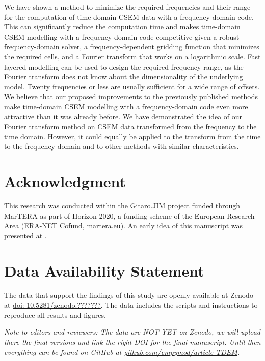 \documentclass[
    manuscript,
    revised,
  ]{geophysics}
\begin{document}
We have shown a method to minimize the required frequencies and their range for
the computation of time-domain CSEM data with a frequency-domain code. This can
significantly reduce the computation time and makes time-domain CSEM modelling
with a frequency-domain code competitive given a robust frequency-domain
solver, a frequency-dependent gridding function that minimizes the required
cells, and a Fourier transform that works on a logarithmic scale. Fast layered
modelling can be used to design the required frequency range, as the Fourier
transform does not know about the dimensionality of the underlying model.
Twenty frequencies or less are usually sufficient for a wide range of offsets.
 We believe that our proposed improvements to the previously
published methods make time-domain CSEM modelling with a frequency-domain code
even more attractive than it was already before. We have demonstrated the idea
of our Fourier transform method on CSEM data transformed from the frequency to
the time domain. However, it could equally be applied to the transform from the
time to the frequency domain and to other methods with similar
characteristics.

\section{Acknowledgment}

This research was conducted within the Gitaro.JIM project funded through
MarTERA as part of Horizon 2020, a funding scheme of the European Research Area
(ERA-NET Cofund, \href{https://www.martera.eu}{martera.eu}).
An early idea of this manuscript was presented at \cite{EAGE.20.Werthmuller}.

\section{Data Availability Statement}

The data that support the findings of this study are openly available at Zenodo
at \href{https://zenodo.org/badge/DOI/10.5281/zenodo.???????}{doi:
10.5281/zenodo.???????}. The data includes the scripts and instructions to
reproduce all results and figures.

\emph{Note to editors and reviewers: The data are NOT YET on Zenodo, we will
  upload there the final versions and link the right DOI for the final
  manuscript. Until then everything can be found on GitHub at
  \href{https://github.com/empymod/article-TDEM}%
  {github.com/empymod/article-TDEM}.}



\end{document}
